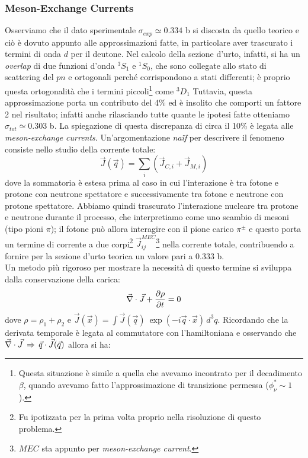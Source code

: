 \subsubsection{Meson-Exchange Currents}
Osserviamo che il dato sperimentale $\sigma_{exp} \simeq 0.334$ b si discosta da quello teorico e ciò è dovuto appunto alle approssimazioni fatte, in particolare aver trascurato i termini di onda $d$ per il deutone. Nel calcolo della sezione d'urto, infatti, si ha un \textit{overlap} di due funzioni d'onda ${^3S_1}$ e ${^1S_0}$, che sono collegate allo stato di scattering del $pn$ e ortogonali perché corrispondono a stati differenti; è proprio questa ortogonalità che  i termini piccoli\footnote{Questa situazione è simile a quella che avevamo incontrato per il decadimento $\beta$, quando avevamo fatto l'approssimazione di transizione permessa ($\phi_\nu^*\sim 1$).} come ${^3D_1}$
Tuttavia, questa approssimazione porta un contributo del 4\% ed è insolito che comporti un fattore 2 nel risultato; infatti anche rilasciando tutte quante le ipotesi fatte otteniamo $\sigma_{tot} \simeq 0.303$ b. La spiegazione di questa discrepanza di circa il 10\% è legata alle \textit{meson-exchange currents}. Un'argomentazione \textit{na\"if} per descrivere il fenomeno consiste nello studio della corrente totale:
$$\vec{J}(\vec{q}) = \sum_i (\vec{J}_{C,i} + \vec{J}_{M,i})$$
dove la sommatoria è estesa prima al caso in cui l'interazione è tra fotone e protone con neutrone spettatore e successivamente tra fotone e neutrone con protone spettatore. Abbiamo quindi trascurato l'interazione nucleare tra protone e neutrone durante il processo, che interpretiamo come uno scambio di mesoni (tipo pioni $\pi$); il fotone può allora interagire con il pione carico $\pi^\pm$ e questo porta un termine di corrente a due corpi\footnote{Fu ipotizzata per la prima volta proprio nella risoluzione di questo problema.} $\vec{J}_{ij}^{MEC}$\footnote{$MEC$ sta appunto per \textit{meson-exchange current}.} nella corrente totale, contribuendo a fornire per la sezione d'urto teorica un valore pari a $0.333$ b.\\
Un metodo più rigoroso per mostrare la necessità di questo termine si sviluppa dalla conservazione della carica:
$$\vec{\nabla}\cdot\vec{J}+\frac{\partial \rho}{\partial t} = 0$$
dove $\rho = \rho_1 + \rho_2$ e $\vec{J}(\vec{x}) = \int \vec{J}(\vec{q})\:\exp{(-i\vec{q}\cdot\vec{x})}\,d^3q$. Ricordando che la derivata temporale è legata al commutatore con l'hamiltoniana e osservando che $\vec{\nabla}\cdot\vec{J}\,\Rightarrow\,\vec{q}\cdot\vec{J}(\vec{q})$ allora si ha:

